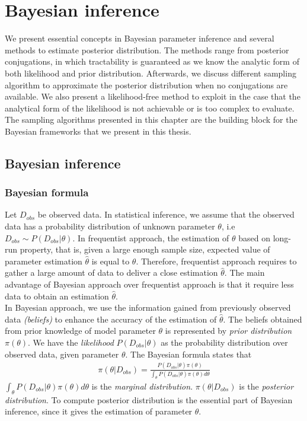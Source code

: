 \chapter{Bayesian inference}
We present essential concepts in Bayesian parameter inference and several methods to estimate
posterior distribution. The methods range from posterior conjugations, in which tractability is
guaranteed as we know the analytic form of both likelihood and prior distribution. Afterwards, we
discuss different sampling algorithm to approximate the posterior distribution when no conjugations
are available. We also present a likelihood-free method to exploit in the case that the analytical
form of the likelihood is not achievable or is too complex to evaluate. The sampling algorithms
presented in this chapter are the building block for the Bayesian frameworks that we present in this
thesis.

\section{Bayesian inference}
\subsection{Bayesian formula}
Let $D_{obs}$ be observed data. In statistical inference, we assume that the observed data has a
probability distribution of unknown parameter $\theta$, i.e $D_{obs} \sim P(D_{obs}|\theta)$. In
frequentist approach, the estimation of $\theta$ based on long-run property, that is, given a large
enough sample size, expected value of parameter estimation $\hat{\theta}$ is equal to $\theta$.
Therefore, frequentist approach requires to gather a large amount of data to deliver a close
estimation $\hat{\theta}$.  The main advantage of Bayesian approach over frequentist approach is
that it require less data to obtain an estimation $\hat{\theta}$.\\
In Bayesian approach, we use the information gained from previously observed data \textit{(beliefs)}
to enhance the accuracy of the estimation of $\hat{\theta}$. The beliefs obtained from prior
knowledge of model parameter $\theta$ is represented by \textit{prior distribution} $\pi(\theta)$.
We have the \textit{likelihood} $P(D_{obs}|\theta)$ as the probability distribution over observed
data, given parameter $\theta$. The Bayesian formula states that
\begin{align*}
    \pi(\theta | D_{obs}) = \frac{P(D_{obs}|\theta)\pi(\theta)}{\int_\theta P(D_{obs}|\theta)\pi(\theta)d\theta}
\end{align*}
$\int_\theta P(D_{obs}|\theta)\pi(\theta)d\theta$ is the \textit{marginal distribution}. $\pi(\theta
    | D_{obs})$ is the \textit{posterior distribution}. To compute posterior distribution is the
essential part of Bayesian inference, since it gives the estimation of parameter $\theta$.

